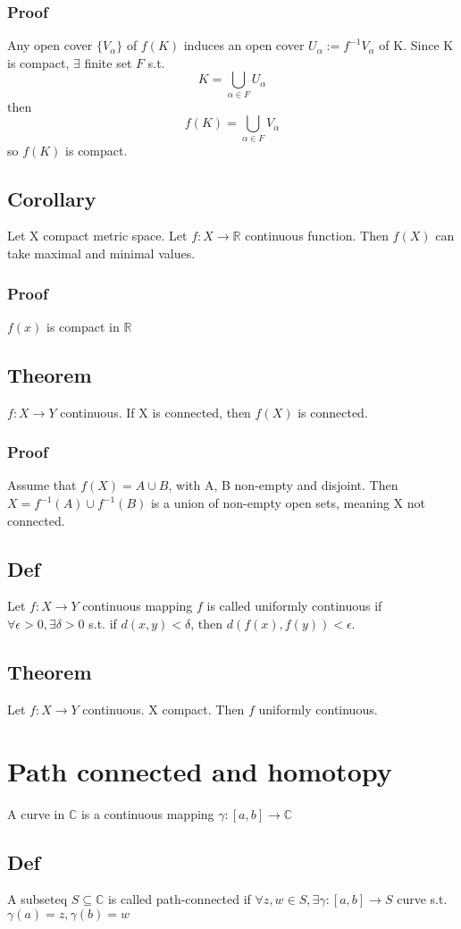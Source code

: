\documentclass{book}
\begin{document}
\subsection*{Proof}
Any open cover $\{V_\alpha\}$ of $f(K)$ induces an open cover $U_\alpha:=f^{-1}V_\alpha$ of K. Since K is compact, $\exists$ finite set $F$ s.t. $$K=\bigcup\limits_{\alpha\in F}U_\alpha$$
then $$f(K)=\bigcup\limits_{\alpha\in F}V_\alpha$$
so $f(K)$ is compact.
\section{Corollary}
Let X compact metric space. Let $f:X\rightarrow \mathbb R$ continuous function. Then $f(X)$ can take maximal and minimal values.
\subsection*{Proof}
$f(x)$ is compact in $\mathbb R$
\section{Theorem}$f:X\rightarrow Y$ continuous. If X is connected, then $f(X)$ is connected.
\subsection{Proof}
Assume that $f(X)=A\cup B$, with A, B non-empty and disjoint. Then $X=f^{-1}(A)\cup f^{-1}(B)$ is a union of non-empty open sets, meaning X not connected.
\section{Def}
Let $f:X\rightarrow Y$ continuous mapping $f$ is called uniformly continuous if $\forall \epsilon>0,\exists \delta>0$ s.t. if $d(x,y)<\delta$, then $d(f(x),f(y))<\epsilon$.
\section{Theorem}Let $f:X\rightarrow Y$ continuous. X compact. Then $f$ uniformly continuous.
\chapter{Path connected and homotopy}
A curve in $\mathbb C$ is a continuous mapping $\gamma:[a,b]\rightarrow \mathbb C$
\section{Def}
A subseteq $S\subseteq \mathbb C$ is called path-connected if $\forall z,w\in S,\exists \gamma:[a,b]\rightarrow S$ curve s.t. $\gamma(a)=z,\gamma(b)=w$
\end{document}
